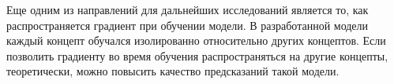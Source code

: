 Еще одним из направлений для дальнейших исследований является то,
как распространяется градиент при обучении модели. В разработанной
модели каждый концепт обучался изолированно относительно других концептов.
Если позволить градиенту во время обучения распространяться на другие
концепты, теоретически, можно повысить качество предсказаний такой модели.
